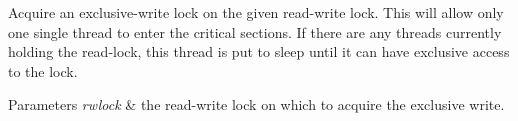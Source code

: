 Acquire an exclusive-\/write lock on the given read-\/write lock. This will allow only one single thread to enter the critical sections. If there are any threads currently holding the read-\/lock, this thread is put to sleep until it can have exclusive access to the lock. 
\begin{DoxyParams}{Parameters}
{\em rwlock} & the read-\/write lock on which to acquire the exclusive write. \\
\hline
\end{DoxyParams}
